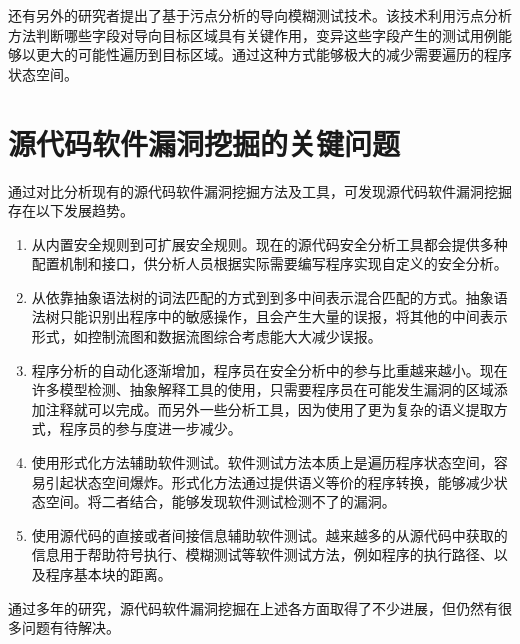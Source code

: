 还有另外的研究者提出了基于污点分析的导向模糊测试技术。该技术利用污点分析方法判断哪些字段对导向目标区域具有关键作用，变异这些字段产生的测试用例能够以更大的可能性遍历到目标区域。通过这种方式能够极大的减少需要遍历的程序状态空间。


\section{源代码软件漏洞挖掘的关键问题}

通过对比分析现有的源代码软件漏洞挖掘方法及工具，可发现源代码软件漏洞挖掘存在以下发展趋势。%
\begin{enumerate}[(1)]
\item 从内置安全规则到可扩展安全规则。现在的源代码安全分析工具都会提供多种配置机制和接口，供分析人员根据实际需要编写程序实现自定义的安全分析。
\item 从依靠抽象语法树的词法匹配的方式到到多中间表示混合匹配的方式。抽象语法树只能识别出程序中的敏感操作，且会产生大量的误报，将其他的中间表示形式，如控制流图和数据流图综合考虑能大大减少误报。
\item 程序分析的自动化逐渐增加，程序员在安全分析中的参与比重越来越小。现在许多模型检测、抽象解释工具的使用，只需要程序员在可能发生漏洞的区域添加注释就可以完成。而另外一些分析工具，因为使用了更为复杂的语义提取方式，程序员的参与度进一步减少。
\item 使用形式化方法辅助软件测试。软件测试方法本质上是遍历程序状态空间，容易引起状态空间爆炸。形式化方法通过提供语义等价的程序转换，能够减少状态空间。将二者结合，能够发现软件测试检测不了的漏洞。
\item 使用源代码的直接或者间接信息辅助软件测试。越来越多的从源代码中获取的信息用于帮助符号执行、模糊测试等软件测试方法，例如程序的执行路径、以及程序基本块的距离。
\end{enumerate}

通过多年的研究，源代码软件漏洞挖掘在上述各方面取得了不少进展，但仍然有很多问题有待解决。

